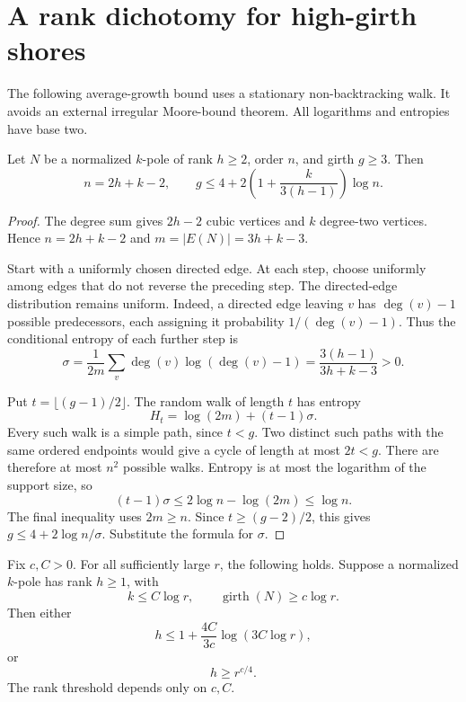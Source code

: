 \section{A rank dichotomy for high-girth shores}
\label{sec:four-high-connectivity-entropy-moore}

The following average-growth bound uses a stationary non-backtracking walk.
It avoids an external irregular Moore-bound theorem.
All logarithms and entropies have base two.

\begin{lemma}
\label{lem:four-entropy-moore}
Let $N$ be a normalized $k$-pole of rank $h\ge2$, order $n$, and girth $g\ge3$.
Then
\[
 n=2h+k-2,
 \qquad
 g\le4+2\left(1+\frac{k}{3(h-1)}\right)\log n.
\]
\end{lemma}

\begin{proof}
The degree sum gives $2h-2$ cubic vertices and $k$ degree-two vertices.
Hence $n=2h+k-2$ and $m=|E(N)|=3h+k-3$.

Start with a uniformly chosen directed edge.
At each step, choose uniformly among edges that do not reverse the preceding step.
The directed-edge distribution remains uniform.
Indeed, a directed edge leaving $v$ has $\deg(v)-1$ possible predecessors, each assigning it probability $1/(\deg(v)-1)$.
Thus the conditional entropy of each further step is
\[
 \sigma=\frac{1}{2m}\sum_v\deg(v)\log(\deg(v)-1)
       =\frac{3(h-1)}{3h+k-3}>0.
\]

Put $t=\lfloor(g-1)/2\rfloor$.
The random walk of length $t$ has entropy
\[
 H_t=\log(2m)+(t-1)\sigma.
\]
Every such walk is a simple path, since $t<g$.
Two distinct such paths with the same ordered endpoints would give a cycle of length at most $2t<g$.
There are therefore at most $n^2$ possible walks.
Entropy is at most the logarithm of the support size, so
\[
 (t-1)\sigma\le2\log n-\log(2m)\le\log n.
\]
The final inequality uses $2m\ge n$.
Since $t\ge(g-2)/2$, this gives $g\le4+2\log n/\sigma$.
Substitute the formula for $\sigma$.
\end{proof}

\begin{corollary}
\label{cor:four-high-girth-shore-dichotomy}
Fix $c,C>0$.
For all sufficiently large $r$, the following holds.
Suppose a normalized $k$-pole has rank $h\ge1$, with
\[
 k\le C\log r,
 \qquad \operatorname{girth}(N)\ge c\log r.
\]
Then either
\[
 h\le1+\frac{4C}{3c}\log(3C\log r),
\]
or
\[
 h\ge r^{c/4}.
\]
The rank threshold depends only on $c,C$.
\end{corollary}

